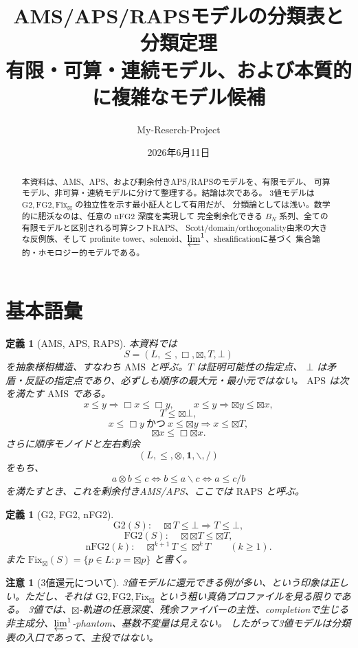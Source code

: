 \documentclass[uplatex,dvipdfmx,a4paper,10pt]{jsarticle}
\title{AMS/APS/RAPSモデルの分類表と分類定理\\
{\large 有限・可算・連続モデル、および本質的に複雑なモデル候補}}
\author{My-Reserch-Project}
\date{2026年6月11日}
\newtheorem{definition}[theorem]{定義}
\newtheorem{remark}[theorem]{注意}
\newcommand{\AMS}{\mathrm{AMS}}
\newcommand{\APS}{\mathrm{APS}}
\newcommand{\RAPS}{\mathrm{RAPS}}
\newcommand{\Gtwo}{\mathrm{G2}}
\newcommand{\FGtwo}{\mathrm{FG2}}
\newcommand{\nFGtwo}{\mathrm{nFG2}}
\newcommand{\Fix}{\mathrm{Fix}}
\newcommand{\bt}{\boxtimes}
\newcommand{\resl}{\backslash}
\newcommand{\resr}{/}
\begin{document}
\maketitle

\begin{abstract}
本資料は、AMS、APS、および剰余付きAPS/RAPSのモデルを、有限モデル、
可算モデル、非可算・連続モデルに分けて整理する。結論は次である。
3値モデルは \(\Gtwo,\FGtwo,\Fix_{\bt}\) の独立性を示す最小証人として有用だが、
分類論としては浅い。数学的に肥沃なのは、任意の \(\nFGtwo\) 深度を実現して
完全剰余化できる \(B_N\) 系列、全ての有限モデルと区別される可算シフトRAPS、
Scott/domain/orthogonality由来の大きな反例族、そして
profinite tower、solenoid、\(\varprojlim^1\)、sheafificationに基づく
集合論的・ホモロジー的モデルである。
\end{abstract}

\section{基本語彙}

\begin{definition}[AMS, APS, RAPS]
本資料では
\[
S=(L,\le,\Box,\bt,T,\bot)
\]
を抽象様相構造、すなわち \(\AMS\) と呼ぶ。\(T\) は証明可能性の指定点、
\(\bot\) は矛盾・反証の指定点であり、必ずしも順序の最大元・最小元ではない。
\(\APS\) は次を満たす \(\AMS\) である。
\[
x\le y\Rightarrow \Box x\le\Box y,\qquad
x\le y\Rightarrow \bt y\le\bt x,
\]
\[
T\le\bt\bot,
\]
\[
x\le\Box y\ \text{かつ}\ x\le\bt y\Rightarrow x\le\bt T,
\]
\[
\bt x\le\Box\bt x.
\]
さらに順序モノイドと左右剰余
\[
(L,\le,\otimes,\mathbf 1,\resl,\resr)
\]
をもち、
\[
a\otimes b\le c
\iff
b\le a\resl c
\iff
a\le c\resr b
\]
を満たすとき、これを剰余付きAMS/APS、ここでは \(\RAPS\) と呼ぶ。
\end{definition}

\begin{definition}[G2, FG2, nFG2]
\[
\Gtwo(S):\quad \bt T\le\bot\Rightarrow T\le\bot,
\]
\[
\FGtwo(S):\quad \bt\bt T\le\bt T,
\]
\[
\nFGtwo(k):\quad \bt^{k+1}T\le\bt^kT\qquad(k\ge1).
\]
また \(\Fix_{\bt}(S)=\{p\in L:p=\bt p\}\) と書く。
\end{definition}

\begin{remark}[3値還元について]
3値モデルに還元できる例が多い、という印象は正しい。ただし、それは
\(\Gtwo,\FGtwo,\Fix_{\bt}\) という粗い真偽プロファイルを見る限りである。
3値では、\(\bt\)-軌道の任意深度、残余ファイバーの主性、completionで生じる
非主成分、\(\varprojlim^1\)-phantom、基数不変量は見えない。
したがって3値モデルは分類表の入口であって、主役ではない。
\end{remark}
\end{document}
